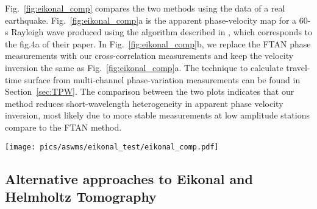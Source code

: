 Fig.~\ref{fig:eikonal_comp} compares the two methods using the data of a real earthquake. Fig.~\ref{fig:eikonal_comp}a is the apparent phase-velocity map for a 60-s Rayleigh wave produced using the algorithm described in \citet{Lin:2011fw}, which corresponds to the fig.4a of their paper. In Fig.~\ref{fig:eikonal_comp}b, we replace the FTAN phase measurements with our cross-correlation measurements and keep the velocity inversion the same as Fig.~\ref{fig:eikonal_comp}a. The technique to calculate travel-time surface from multi-channel phase-variation measurements can be found in Section~\ref{sec:TPW}. The comparison between the two plots indicates that our method reduces short-wavelength heterogeneity in apparent phase velocity inversion, most likely due to more stable measurements at low amplitude stations compare to the FTAN method. 


\begin{figure*}
	\texttt{[image: pics/aswms/eikonal\_test/eikonal\_comp.pdf]}
	\caption[60-s Rayleigh-wave Eikonal tomography results for the April 7, 2009 earthquake near Kuril Islands ($M_s$=6.8), using different phase measuring and tomographic inversions techniques.]{60-s Rayleigh-wave Eikonal tomography results for the April 7, 2009 earthquake near Kuril Islands ($M_s$=6.8), using different phase measuring and tomographic inversions techniques.\textbf{a)} Phase measurement: FTAN; Tomography: gradient of the travel-time surface. \textbf{b)} Phase measurement: cross-correlation; Tomography: gradient of the travel-time surface. \textbf{c)}Phase measurement: cross-correlation; Tomography: slowness vector inversion.}
	\label{fig:eikonal_comp}
\end{figure*}

\subsection{Alternative approaches to Eikonal and Helmholtz Tomography}
\label{sec:helm_dis}

